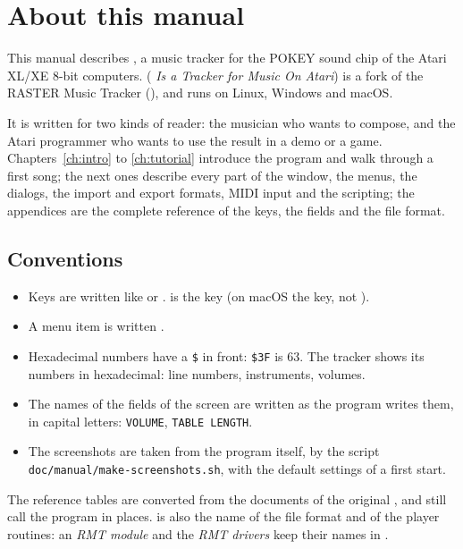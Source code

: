 \chapter*{About this manual}

This manual describes \RITMO{}, a music tracker for the POKEY sound chip of the Atari XL/XE
8-bit computers. \RITMO{} (\emph{\RITMO{} Is a Tracker for Music On Atari}) is a fork of the
RASTER Music Tracker (\RMT{}), and runs on Linux, Windows and macOS.

It is written for two kinds of reader: the musician who wants to compose, and the Atari
programmer who wants to use the result in a demo or a game. Chapters~\ref{ch:intro} to
\ref{ch:tutorial} introduce the program and walk through a first song; the next ones describe
every part of the window, the menus, the dialogs, the import and export formats, MIDI input
and the scripting; the appendices are the complete reference of the keys, the fields and the
file format.

\section*{Conventions}

\begin{itemize}
  \item Keys are written like  or .  is the  key
        (on macOS the  key, not ).
  \item A menu item is written .
  \item Hexadecimal numbers have a \texttt{\$} in front: \texttt{\$3F} is 63. The tracker shows
        its numbers in hexadecimal: line numbers, instruments, volumes.
  \item The names of the fields of the screen are written as the program writes them, in capital
        letters: \texttt{VOLUME}, \texttt{TABLE LENGTH}.
  \item The screenshots are taken from the program itself, by the script
        \texttt{doc/manual/make-screenshots.sh}, with the default settings of a first start.
\end{itemize}

\begin{note}
The reference tables are converted from the documents of the original \RMT{}, and still call the program \RMT{} in places. \RMT{} is also the name of
the file format and of the player routines: an \emph{RMT module} and the \emph{RMT drivers} keep their names in \RITMO{}.
\end{note}

